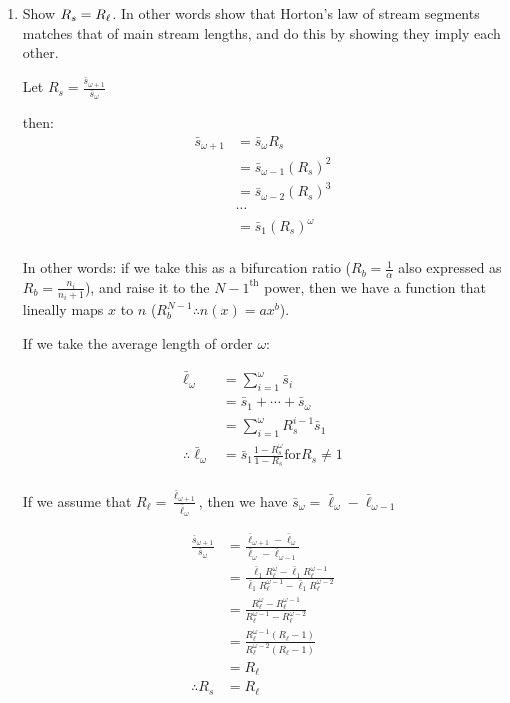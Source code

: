 \begin{enumerate}
  
\item Show $R_s = R_\ell$.  In other words show that Horton's law of
  stream segments matches that of main stream lengths, and do
  this by showing they imply each other.

  
   \solutionstart

   Let $R_s = \frac{\bar{s}_{\omega+1}}{\bar{s}_{\omega}}$

   then:
   \begin{align}
       \bar{s}_{\omega+1} &= \bar{s}_{\omega}R_s\\
       &= \bar{s}_{\omega-1}(R_s)^2\\
       &= \bar{s}_{\omega-2}(R_s)^3\\
       &\cdots\\
       &= \bar{s}_{1}(R_s)^{\omega}\\
   \end{align}
   
   In other words: if we take this as a bifurcation ratio ($R_b = \frac{1}{\alpha}$ also expressed as $R_b = \frac{n_i}{n_i + 1}$), and raise it to the $N-1^{\text{th}}$ power, then we have a function that lineally maps $x$ to $n$ ($R_{b}^{N-1} \therefore n(x)=ax^b$).

   If we take the average length of order $\omega$:

   \begin{align}
       \bar{\ell}_{\omega} &= \sum^{\omega}_{i=1}{\bar{s}_i}\\
       &= \bar{s}_1 + \cdots + \bar{s}_{\omega}\\
       &= \sum_{i=1}^{\omega}{R^{i-1}_{s}\bar{s}_1}\\
       \therefore \bar{\ell}_{\omega} &= \bar{s}_1\frac{1-R_{s}^{\omega}}{1-R_s} \text{for} R_s \neq 1\\
   \end{align}

   If we assume that $R_\ell = \frac{\bar{\ell}_{\omega+1}}{\bar{\ell}_\omega}$, then we have $\bar{s}_\omega = \bar{\ell}_\omega - \bar{\ell}_{\omega-1}$

   \begin{align}
       \frac{\bar{s}_{\omega+1}}
       {\bar{s}_{\omega}}
       &= \frac{\bar{\ell}_{\omega+1} - \bar{\ell}_{\omega}}
       {\bar{\ell}_\omega - \bar{\ell}_{\omega-1}}\\
       &= \frac{\bar{\ell}_1 R_{\ell}^{\omega} - \bar{\ell}_1 R_{\ell}^{\omega-1}}
       {\bar{\ell}_1 R_{\ell}^{\omega-1} - \bar{\ell}_1 R_{\ell}^{\omega-2}}\\
       &= \frac{R_{\ell}^{\omega} - R_{\ell}^{\omega-1}}
       {R_{\ell}^{\omega-1} - R_{\ell}^{\omega-2}}\\
       &= \frac{R_{\ell}^{\omega-1}(R_\ell - 1)}
       {R_{\ell}^{\omega-2}(R_\ell - 1)}\\
       &= R_\ell\\
       \therefore R_s & = R_\ell\\
   \end{align}

   \solutionend


\end{enumerate}